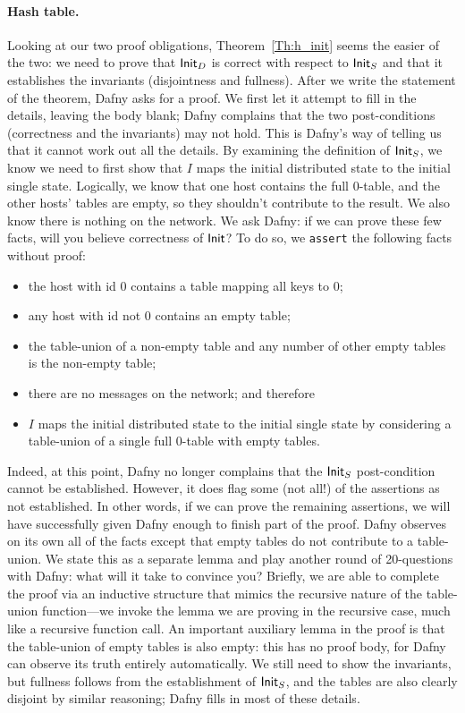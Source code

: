 \paragraph{Hash table.} Looking at our two proof obligations,
Theorem~\ref{Th:h_init} seems the easier of the two: we need to prove that
\(\mathsf{Init}_{D}\) is correct with respect to \(\mathsf{Init}_{S}\) and that it
establishes the invariants (disjointness and fullness). After we write the
statement of the theorem, Dafny asks for a proof. We first let it attempt to
fill in the details, leaving the body blank; Dafny complains that the two
post-conditions (correctness and the invariants) may not hold. This is Dafny's
way of telling us that it cannot work out all the details. By examining the
definition of \(\mathsf{Init}_{S}\), we know we need to first show that \(I\) maps
the initial distributed state to the initial single state. Logically, we know
that one host contains the full 0-table, and the other hosts' tables are empty,
so they shouldn't contribute to the result. We also know there is nothing on the
network. We ask Dafny: if we can prove these few facts, will you believe
correctness of \(\mathsf{Init}\)? To do so, we \texttt{assert} the following facts
without proof:
\begin{itemize}
    \item the host with id 0 contains a table mapping all keys to 0;
    \item any host with id not 0 contains an empty table;
    \item the table-union of a non-empty table and any number of other empty
        tables is the non-empty table;
    \item there are no messages on the network; and therefore
    \item \(I\) maps the initial distributed state to the initial single state
        by considering a table-union of a single full 0-table with empty tables.
\end{itemize}
Indeed, at this point, Dafny no longer complains that the \(\mathsf{Init}_{S}\)
post-condition cannot be established. However, it does flag some (not all!) of
the assertions as not established. In other words, if we can prove the remaining
assertions, we will have successfully given Dafny enough to finish part of the
proof. Dafny observes on its own all of the facts except that empty tables do
not contribute to a table-union. We state this as a separate lemma and play
another round of 20-questions with Dafny: what will it take to convince you?
Briefly, we are able to complete the proof via an inductive structure that
mimics the recursive nature of the table-union function---we invoke the lemma we
are proving in the recursive case, much like a recursive function call. An
important auxiliary lemma in the proof is that the table-union of empty tables
is also empty: this has no proof body, for Dafny can observe its truth entirely
automatically. We still need to show the invariants, but fullness follows from
the establishment of \(\mathsf{Init}_{S}\), and the tables are also clearly
disjoint by similar reasoning; Dafny fills in most of these details.

